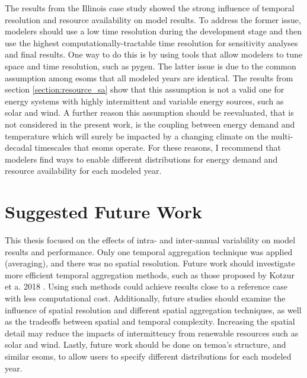 The results from the Illinois case study showed the strong influence of temporal
resolution and resource availability on model results. To address the former issue,
modelers should use a low time resolution during the development stage and then use the
highest computationally-tractable time resolution for sensitivity analyses and final
results. One way to do this is by using tools that allow modelers to tune space
and time resolution, such as \gls{pygen}. The latter issue is due to the common
assumption among \glspl{esom} that all modeled years are identical. The results
from section \ref{section:resource_sa} show that this assumption is not a valid
one for energy systems with highly intermittent and variable energy sources, such
as solar and wind. A further reason this assumption should be reevaluated, that
is not considered in the present work, is the coupling between energy demand and
temperature which will surely be impacted by a changing climate on the multi-decadal
timescales that \glspl{esom} operate. For these reasons, I recommend that modelers
find ways to enable different distributions for energy demand and resource availability
for each modeled year.


\section{Suggested Future Work}

This thesis focused on the effects of intra- and inter-annual variability on model
results and performance. Only one temporal aggregation technique was applied (averaging),
and there was no spatial resolution. Future work should investigate more efficient
temporal aggregation methods, such as those proposed by Kotzur et a. 2018
\cite{kotzur_impact_2018}. Using such methods could achieve results close to a reference
case with less computational cost. Additionally, future studies should examine the influence
of spatial resolution and different spatial aggregation techniques, as well as
the tradeoffs between spatial and temporal complexity. Increasing the spatial detail
may reduce the impacts of intermittency from renewable resources such as solar and
wind. Lastly, future work should be done on \gls{temoa}'s structure, and similar
\glspl{esom}, to allow users to specify different distributions for each modeled year.
